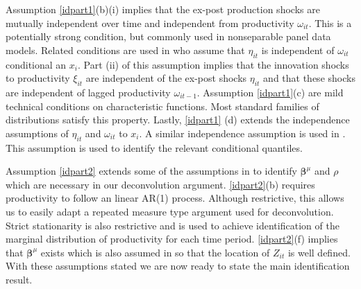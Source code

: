 \documentclass[11pt]{article}
\begin{document}
Assumption \ref{idpart1}(b)(i) implies that the ex-post production shocks are mutually independent over time and independent from productivity $\omega_{it}$. This is a potentially strong condition, but commonly used in nonseparable panel data models. Related conditions are used in \cite{Hu2019} who assume that $\eta_{it}$ is independent of $\omega_{it}$ conditional an $x_{i}$. Part (ii) of this assumption implies that the innovation shocks to productivity $\xi_{it}$ are independent of the ex-post shocks $\eta_{it}$ and that these shocks are independent of lagged productivity $\omega_{it-1}$. Assumption \ref{idpart1}(c) are mild technical conditions on characteristic functions. Most standard families of distributions satisfy this property. Lastly, \ref{idpart1} (d) extends the independence assumptions of $\eta_{it}$ and $\omega_{it}$ to $x_{i}$. A similar independence assumption is used in \cite{Gandhi2020}. This assumption is used to identify the relevant conditional quantiles.

Assumption \ref{idpart2} extends some of the assumptions in \cite{Ackerberg2015} to identify $\boldsymbol{\beta}^{\mu}$ and $\rho$ which are necessary in our deconvolution argument. \ref{idpart2}(b) requires productivity to follow an linear AR(1) process. Although restrictive, this allows us to easily adapt a repeated measure type argument used for deconvolution. Strict stationarity is also restrictive and is used to achieve identification of the marginal distribution of productivity for each time period. \ref{idpart2}(f) implies that $\boldsymbol{\beta}^{\mu}$ exists which is also assumed in \cite{Canay2011} so that the location of $Z_{it}$ is well defined. With these assumptions stated we are now ready to state the main identification result.
\end{document}
